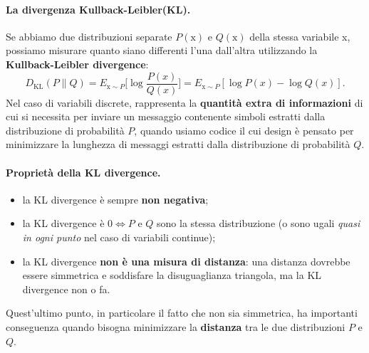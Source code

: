 \paragraph{La divergenza Kullback-Leibler(KL).} Se abbiamo due distribuzioni separate $P(\text{x})$ e $Q(\text{x})$ della stessa variabile x, possiamo misurare quanto siano differenti l'una dall'altra utilizzando la \textbf{Kullback-Leibler divergence}:
\begin{equation}
    D_{\text{KL}}(P\|Q)=E_{\text{x}\sim P}\Big[ \log\frac{P(x)}{Q(x)} \Big]=E_{\text{x}\sim P}[\log P(x)-\log Q(x)].
\end{equation}
Nel caso di variabili discrete, rappresenta la \textbf{quantità extra di informazioni} di cui si necessita per inviare un messaggio contenente simboli estratti dalla distribuzione di probabilità $P$, quando usiamo codice il cui design è pensato per minimizzare la lunghezza di messaggi estratti dalla distribuzione di probabilità $Q$.



\paragraph{Proprietà della KL divergence.}
\begin{itemize}
    \item la KL divergence è sempre \textbf{non negativa};
    \item la KL divergence è $0\Longleftrightarrow P$ e $Q$ sono la stessa distribuzione (o sono ugali \textit{quasi in ogni punto} nel caso di variabili continue);
    \item la KL divergence \textbf{non è una misura di distanza}: una distanza dovrebbe essere simmetrica e soddisfare la disuguaglianza triangola, ma la KL divergence non o fa.
\end{itemize}
Quest'ultimo punto, in particolare il fatto che non sia simmetrica, ha importanti conseguenza quando bisogna minimizzare la \textbf{distanza} tra le due distribuzioni $P$ e $Q$.



